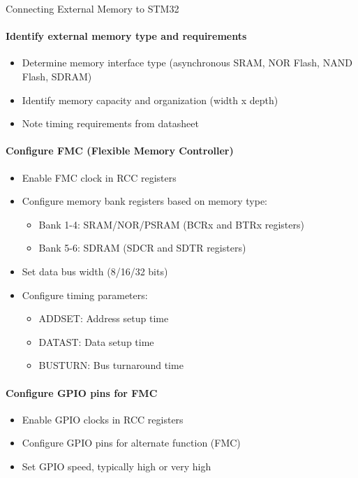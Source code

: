\begin{KR}{Connecting External Memory to STM32}\\
\paragraph{Identify external memory type and requirements}
\begin{itemize}
    \item Determine memory interface type (asynchronous SRAM, NOR Flash, NAND Flash, SDRAM)
    \item Identify memory capacity and organization (width x depth)
    \item Note timing requirements from datasheet
\end{itemize}

\paragraph{Configure FMC (Flexible Memory Controller)}
\begin{itemize}
    \item Enable FMC clock in RCC registers
    \item Configure memory bank registers based on memory type:
    \begin{itemize}
        \item Bank 1-4: SRAM/NOR/PSRAM (BCRx and BTRx registers)
        \item Bank 5-6: SDRAM (SDCR and SDTR registers)
    \end{itemize}
    \item Set data bus width (8/16/32 bits)
    \item Configure timing parameters:
    \begin{itemize}
        \item ADDSET: Address setup time
        \item DATAST: Data setup time
        \item BUSTURN: Bus turnaround time
    \end{itemize}
\end{itemize}

\paragraph{Configure GPIO pins for FMC}
\begin{itemize}
    \item Enable GPIO clocks in RCC registers
    \item Configure GPIO pins for alternate function (FMC)
    \item Set GPIO speed, typically high or very high
\end{itemize}


\end{KR}
